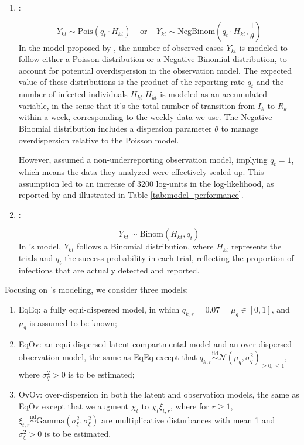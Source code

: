 \documentclass[10pt]{article}
\begin{document}
\begin{enumerate}
    \item \citep{stocks}:

    $$
    Y_{kt} \sim \text{Pois}(q_t \cdot H_{kt}) \;\;\;\; \text{or} \;\;\;\; Y_{kt} \sim \text{NegBinom}(q_t \cdot H_{kt}, \frac{1}{\theta})
    $$
    In the model proposed by \cite{stocks}, the number of observed cases \( Y_{kt} \) is modeled to follow either a Poisson distribution or a Negative Binomial distribution, to account for potential overdispersion in the observation model. The expected value of these distributions is the product of the reporting rate \( q_t \) and the number of infected individuals \( H_{kt} \).\( H_{kt} \) is modeled as an accumulated variable, in the sense that it's the total number of transition from $I_{k}$ to $R_{k}$ within a week, corresponding to the weekly data we use. The Negative Binomial distribution includes a dispersion parameter \( \theta \) to manage overdispersion relative to the Poisson model. 
    
    However, \cite{stocks} assumed a non-underreporting observation model, implying 
    $q_t = 1$, which means the data they analyzed were effectively scaled up. This assumption led to an increase of 3200 log-units in the log-likelihood, as reported by \cite{wwr} and illustrated in Table \ref{tab:model_performance}.


    \item \citep{wwr}:

    $$
    Y_{kt} \sim \text{Binom}(H_{kt}, q_t)
    $$
    In \cite{wwr}'s model, \( Y_{kt} \) follows a Binomial distribution, where \( H_{kt} \) represents the trials and \( q_t \) the success probability in each trial, reflecting the proportion of infections that are actually detected and reported.
\end{enumerate} 


Focusing on \cite{wwr}'s modeling, we consider three models: 

\begin{enumerate}
    \item EqEq: a fully equi-dispersed model, in which \( q_{k,r} = 0.07 = \mu_q \in [0, 1] \), and \( \mu_q \) is assumed to be known;

    \item EqOv: an equi-dispersed latent compartmental model and an over-dispersed observation model, the same as EqEq except that \( q_{k,r} \overset{\text{iid}}{\sim} \mathcal{N}(\mu_{q}, \sigma^{2}_{q})_{\geq 0,\leq 1} \), where \( \sigma^{2}_{q} > 0 \) is to be estimated;

    \item OvOv: over-dispersion in both the latent and observation models, the same as EqOv except that we augment \( \chi_t \) to \( \chi_t \xi_{t,r} \), where for \( r \geq 1 \), \( \xi_{t,r} \overset{\text{iid}}{\sim} \text{Gamma}(\sigma^{2}_{\xi}, \sigma^{2}_{\xi}) \) are multiplicative disturbances with mean 1 and \( \sigma^{2}_{\xi} > 0 \) is to be estimated.

\end{enumerate}
\end{document}
